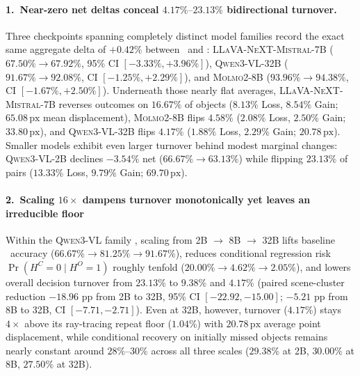 \paragraph{1.\ Near-zero net deltas conceal $4.17\%\text{--}23.13\%$ bidirectional turnover.}
Three checkpoints spanning completely distinct model families record the exact same aggregate delta of $+0.42\%$ between \original\ and \converted: \textsc{LLaVA-NeXT-Mistral-7B} ($67.50\% \to 67.92\%$, 95\% CI $[-3.33\%, +3.96\%]$), \textsc{Qwen3-VL-32B} ($91.67\% \to 92.08\%$, CI $[-1.25\%, +2.29\%]$), and \textsc{Molmo2-8B} ($93.96\% \to 94.38\%$, CI $[-1.67\%, +2.50\%]$). Underneath those nearly flat averages, \textsc{LLaVA-NeXT-Mistral-7B} reverses outcomes on $16.67\%$ of objects ($8.13\%$ Loss, $8.54\%$ Gain; $65.08\,\mathrm{px}$ mean displacement), \textsc{Molmo2-8B} flips $4.58\%$ ($2.08\%$ Loss, $2.50\%$ Gain; $33.80\,\mathrm{px}$), and \textsc{Qwen3-VL-32B} flips $4.17\%$ ($1.88\%$ Loss, $2.29\%$ Gain; $20.78\,\mathrm{px}$). Smaller models exhibit even larger turnover behind modest marginal changes: \textsc{Qwen3-VL-2B} declines $-3.54\%$ net ($66.67\% \to 63.13\%$) while flipping \textbf{$23.13\%$} of pairs ($13.33\%$ Loss, $9.79\%$ Gain; $69.70\,\mathrm{px}$).

\paragraph{2.\ Scaling $16\times$ dampens turnover monotonically yet leaves an irreducible floor}
Within the \textsc{Qwen3-VL} family \citep{Bai2025Qwen3}, scaling from 2B $\to$ 8B $\to$ 32B lifts baseline \original\ accuracy ($66.67\% \to 81.25\% \to 91.67\%$), reduces conditional regression risk $\Pr(H^C{=}0 \mid H^O{=}1)$ roughly tenfold ($20.00\% \to 4.62\% \to 2.05\%$), and lowers overall decision turnover from $23.13\%$ to $9.38\%$ and $4.17\%$ (paired scene-cluster reduction $-18.96$ pp from 2B to 32B, 95\% CI $[-22.92, -15.00]$; $-5.21$ pp from 8B to 32B, CI $[-7.71, -2.71]$). Even at 32B, however, turnover ($4.17\%$) stays $4\times$ above its ray-tracing repeat floor ($1.04\%$) with $20.78\,\mathrm{px}$ average point displacement, while conditional recovery on initially missed objects remains nearly constant around $28\%\text{--}30\%$ across all three scales ($29.38\%$ at 2B, $30.00\%$ at 8B, $27.50\%$ at 32B).

